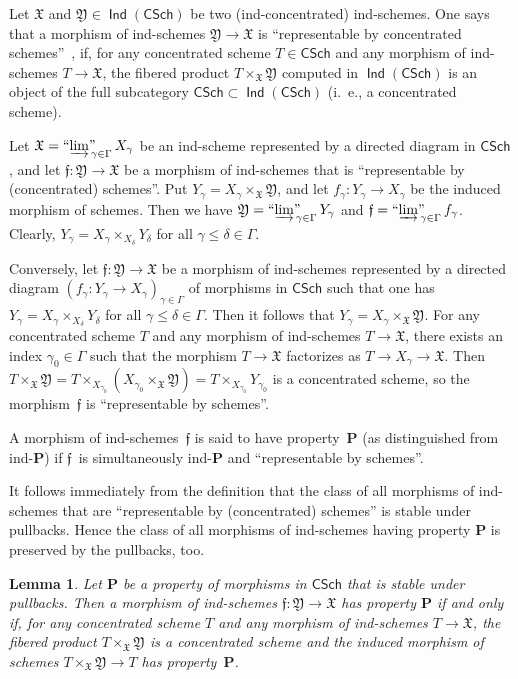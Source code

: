 \documentclass[12pt,a4paper]{amsart}
\newcommand{\+}{\protect\nobreakdash-}
\renewcommand{\:}{\colon}
\newcommand{\rarrow}{\longrightarrow}
\DeclareMathOperator{\Ind}{\mathsf{Ind}}
\newcommand{\CSch}{\mathsf{CSch}}
\newcommand{\ilim}
 {\mathop{\text{\normalfont``$\varinjlim$''\!\!}}\nolimits}
\newcommand{\bP}{\mathbf P}
\newcommand{\fX}{\mathfrak X}
\newcommand{\fY}{\mathfrak Y}
\newcommand{\ff}{\mathfrak f}
\theoremstyle{plain}
\newtheorem{lem}[thm]{Lemma}
\theoremstyle{definition}
\begin{document}
 Let $\fX$ and $\fY\in\Ind(\CSch)$ be two (ind-concentrated)
ind-schemes.
 One says that a morphism of ind-schemes $\fY\rarrow\fX$ is
``representable by concentrated schemes''~\cite[Lemma~1.7 and
Definition~1.8]{Rich}, \cite[Section~1.3]{Psemten} if, for any
concentrated scheme $T\in\CSch$ and any morphism of ind-schemes
$T\rarrow\fX$, the fibered product $T\times_\fX\fY$ computed in
$\Ind(\CSch)$ is an object of the full subcategory
$\CSch\subset\Ind(\CSch)$ (i.~e., a concentrated scheme).

 Let $\fX=\ilim_{\gamma\in\Gamma}X_\gamma$ be an ind-scheme
represented by a directed diagram in $\CSch$, and let
$\ff\:\fY\rarrow\fX$ be a morphism of ind-schemes that is
``representable by (concentrated) schemes''.
 Put $Y_\gamma=X_\gamma\times_\fX\fY$, and let $f_\gamma\:
Y_\gamma\rarrow X_\gamma$ be the induced morphism of schemes.
 Then we have $\fY=\ilim_{\gamma\in\Gamma}Y_\gamma$ and
$\ff=\ilim_{\gamma\in\Gamma}f_\gamma$.
 Clearly, $Y_\gamma=X_\gamma\times_{X_\delta}Y_\delta$ for all
$\gamma\le\delta\in\Gamma$.

 Conversely, let $\ff\:\fY\rarrow\fX$ be a morphism of ind-schemes
represented by a directed diagram $(f_\gamma\:Y_\gamma\to
X_\gamma)_{\gamma\in\Gamma}$ of morphisms in $\CSch$ such that
one has $Y_\gamma=X_\gamma\times_{X_\delta}Y_\delta$ for all
$\gamma\le\delta\in\Gamma$.
 Then it follows that $Y_\gamma=X_\gamma\times_\fX\fY$.
 For any concentrated scheme $T$ and any morphism of ind-schemes
$T\rarrow\fX$, there exists an index $\gamma_0\in\Gamma$ such
that the morphism $T\rarrow\fX$ factorizes as $T\rarrow X_\gamma
\rarrow\fX$.
 Then $T\times_\fX\fY=T\times_{X_{\gamma_0}}(X_{\gamma_0}\times_\fX\fY)
=T\times_{X_{\gamma_0}}Y_{\gamma_0}$ is a concentrated scheme,
so the morphism~$\ff$ is ``representable by schemes''.

 A morphism of ind-schemes~$\ff$ is said to have property~$\bP$ (as
distinguished from ind\+$\bP$) if $\ff$~is simultaneously ind\+$\bP$
and ``representable by schemes''.

 It follows immediately from the definition that the class of all
morphisms of ind-schemes that are ``representable by (concentrated)
schemes'' is stable under pullbacks.
 Hence the class of all morphisms of ind-schemes having property $\bP$
is preserved by the pullbacks, too.

\begin{lem} \label{morphisms-with-property-P}
 Let\/ $\bP$ be a property of morphisms in\/ $\CSch$ that is stable
under pullbacks.
 Then a morphism of ind-schemes\/ $\ff\:\fY\rarrow\fX$ has property\/
$\bP$ if and only if, for any concentrated scheme $T$ and any morphism
of ind-schemes $T\rarrow\fX$, the fibered product $T\times_\fX\fY$ is
a concentrated scheme and the induced morphism of schemes
$T\times_\fX\fY\rarrow T$ has property\/~$\bP$.
\end{lem}
\end{document}
